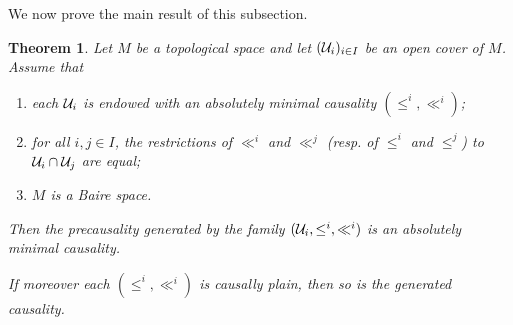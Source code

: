 \documentclass[a4paper,twoside]{article}
\newtheorem{theo}{Theorem}
\begin{document}
We now prove the main result of this subsection.
\begin{theo}\label{theo:causalite_engendre}\label{prop:union_causalite} Let $M$ be a topological space and let $(\mathcal{U}_i)_{i\in I}$ be an open cover of $M$.
Assume that
\begin{enumerate}[label=(\Alph*)]
\item each $\mathcal{U}_i$ is endowed with an absolutely minimal causality $(\leq^i,\ll^i)$;
\item for all $i,j\in I$, the restrictions of $\ll^i$ and $\ll^j$ (resp. of $\leq^i$ and $\leq^j$) to $\mathcal{U}_i\cap \mathcal{U}_j$ are equal;
\item $M$ is a Baire space.
\end{enumerate}
Then the precausality generated by the family $(\mathcal{U}_i,\leq^i,\ll^i)$ is an absolutely minimal causality.

If moreover each $(\leq^i,\ll^i)$ is causally plain, then so is the generated causality.
\end{theo}
\end{document}

